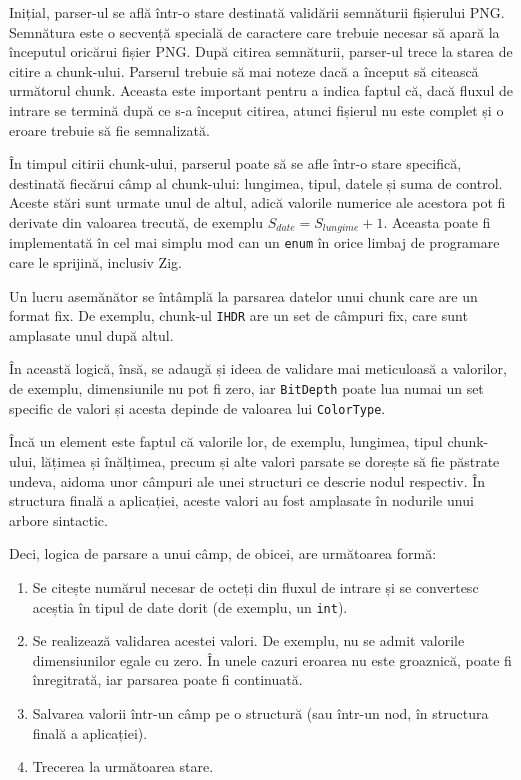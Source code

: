 \documentclass[a4paper,12pt]{report}
\begin{document}
Inițial, parser-ul se află într-o stare destinată validării semnăturii fișierului \ac{PNG}.
Semnătura este o secvență specială de caractere care 
trebuie necesar să apară la începutul oricărui fișier \ac{PNG}.
După citirea semnăturii, parser-ul trece la starea de citire a chunk-ului.
Parserul trebuie să mai noteze dacă a început să citească următorul chunk.
Aceasta este important pentru a indica faptul că, dacă fluxul de intrare
se termină după ce s-a început citirea, atunci fișierul nu este complet și 
o eroare trebuie să fie semnalizată.

În timpul citirii chunk-ului, parserul poate să se afle 
într-o stare specifică, destinată fiecărui câmp al chunk-ului:
lungimea, tipul, datele și suma de control.
Aceste stări sunt urmate unul de altul, adică valorile numerice
ale acestora pot fi derivate din valoarea trecută, de exemplu 
$ S_{date} = S_{lungime} + 1. $
Aceasta poate fi implementată în cel mai simplu mod can un \texttt{enum}
în orice limbaj de programare care le sprijină, inclusiv Zig.

Un lucru asemănător se întâmplă la parsarea datelor unui chunk care are un format fix.
De exemplu, chunk-ul \texttt{IHDR} are un set de câmpuri fix, care sunt amplasate unul după altul.

În această logică, însă, se adaugă și ideea de validare mai meticuloasă a valorilor,
de exemplu, dimensiunile nu pot fi zero, iar \texttt{BitDepth} poate lua numai un set specific de valori
și acesta depinde de valoarea lui \texttt{ColorType}.

Încă un element este faptul că valorile lor, de exemplu, lungimea, tipul chunk-ului,
lățimea și înălțimea, precum și alte valori parsate se dorește să fie păstrate undeva,
aidoma unor câmpuri ale unei structuri ce descrie nodul respectiv.
În structura finală a aplicației, aceste valori au fost amplasate în nodurile unui arbore sintactic.

Deci, logica de parsare a unui câmp, de obicei, are următoarea formă:
\begin{enumerate}
\item
    Se citește numărul necesar de octeți din fluxul de intrare
    și se convertesc aceștia în tipul de date dorit (de exemplu, un \texttt{int}).
\item
    Se realizează validarea acestei valori.
    De exemplu, nu se admit valorile dimensiunilor egale cu zero.
    În unele cazuri eroarea nu este groaznică, poate fi înregitrată, iar parsarea poate fi continuată.
\item
    Salvarea valorii într-un câmp pe o structură (sau într-un nod, în structura finală a aplicației).
\item
    Trecerea la următoarea stare.
\end{enumerate}
\end{document}
